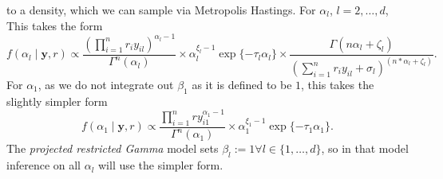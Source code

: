   to a density, which we can sample via Metropolis Hastings\findcite.  For $\alpha_l$,
  $l = 2,\ldots, d$, This takes the form
  \begin{equation}
    \label{eqn:alphafc}
    f(\alpha_l \mid \bm{ y}, r) \propto
    \frac{\left({\textstyle \prod}_{i = 1}^nr_iy_{il}\right)^{\alpha_l - 1}}{\Gamma^n(\alpha_l)} \times
    \alpha_l^{\xi_l - 1}\exp\{-\tau_l\alpha_l\} \times
    \frac{\Gamma(n\alpha_l + \zeta_l)}{
        \left({\textstyle\sum}_{i = 1}^n r_iy_{il} + \sigma_l\right)^{(n * \alpha_l + \zeta_l)}}.
  \end{equation}
  For $\alpha_1$, as we do not integrate out $\beta_1$ as it is defined to be $1$, this takes the
  slightly simpler form
  \begin{equation}
    \label{eqn:alphafc1}
    f(\alpha_1 \mid \bm{ y}, r) \propto
      \frac{{\textstyle\prod}_{i = 1}^n ry_{i1}^{\alpha_1 - 1}}{\Gamma^n(\alpha_1)} \times
      \alpha_1^{\xi_1 - 1}\exp\{-\tau_1\alpha_1\}.
  \end{equation}
  The \emph{projected restricted Gamma} model sets $\beta_l := 1 \forall l \in \lbrace 1,\ldots,d\rbrace$,
  so in that model inference on all $\alpha_l$ will use the simpler form.

